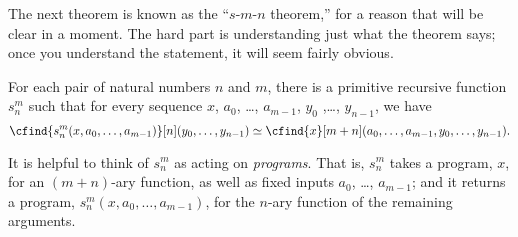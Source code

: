 \documentclass[../../../include/open-logic-section]{subfiles}
\begin{document}

\begin{explain}
The next theorem is known as the ``$s$-$m$-$n$ theorem,'' for a reason
that will be clear in a moment. The hard part is understanding just
what the theorem says; once you understand the statement, it will seem
fairly obvious.
\end{explain}

\begin{thm}
  For each pair of natural numbers $n$ and $m$, there is a primitive
  recursive function $s^m_n$ such that for every sequence
  $x$, $a_0$, \dots, $a_{m-1}$, $y_0$ ,\dots, $y_{n-1}$, we have
  \[
  \cfind{s^m_n(x, a_0, \dots, a_{m-1})}[n](y_0, \dots, y_{n-1}) \simeq
  \cfind{x}[m+n](a_0, \dots, a_{m-1}, y_0, \dots, y_{n-1}).
\]
\end{thm}

\begin{explain}
It is helpful to think of $s^m_n$ as acting on \emph{programs}. That
is, $s^m_n$ takes a program, $x$, for an $(m+n)$-ary function, as well
as fixed inputs $a_0$, \dots, $a_{m-1}$; and it returns a program,
$s^m_n(x, a_0, \dots, a_{m-1})$, for the $n$-ary function of the
remaining arguments. 
\end{explain}
\end{document}
